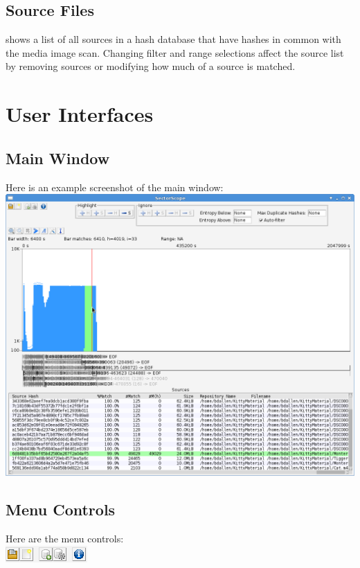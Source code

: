 \documentclass[11pt,fleqn]{article} %
\begin{document}
\subsection{Source Files}
\sscope shows a list of all sources in a hash database that have hashes in common with the media image scan. Changing filter and range selections affect the source list by removing sources or modifying how much of a source is matched.

\section{\sscope User Interfaces}
\subsection{Main Window}
Here is an example screenshot of the \sscope main window:\\
\includegraphics[scale=.4]{screenshots/main_window}\\

\subsection{Menu Controls}
Here are the menu controls:\\
\includegraphics[scale=.4]{screenshots/menu_controls}\\
\end{document}
